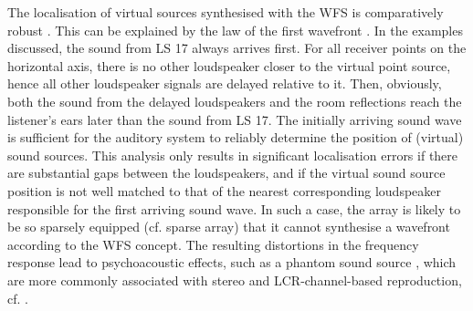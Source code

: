 %
The localisation of virtual sources synthesised with the WFS is comparatively
robust \cite{Start1997_diss,Wittek2007_diss,Rohr2013_JAES,Wierstorf2014_diss,
Erbes2020_diss}.
This can be explained by the law of the first wavefront \cite{Blauert1997_book}.
%
In the examples discussed, the sound from LS 17 always arrives first.
%
For all receiver points on the horizontal axis, there is no other loudspeaker
closer to the virtual point source, hence all other loudspeaker signals
are delayed relative to it.
%
Then, obviously, both the sound from the delayed loudspeakers and the
room reflections reach the listener's ears later than the sound from LS 17.
%
The initially arriving sound wave is sufficient for the auditory system
to reliably determine the position of (virtual) sound sources.
%
This analysis only results in significant localisation errors if there are
substantial gaps between the loudspeakers, and if the virtual sound source
position is not well matched to that of the nearest corresponding loudspeaker
responsible for the first arriving sound wave.
%
In such a case, the array is likely to be so sparsely equipped
(cf. sparse array) that it cannot synthesise a wavefront according
to the WFS concept.
%
The resulting distortions in the frequency response
lead to psychoacoustic effects, such as a phantom sound source
\cite{Blauert1997_book}, which are more commonly associated with stereo
and LCR-channel-based reproduction, cf. \cite{Wittek2007_diss,Wierstorf2014_diss}.



